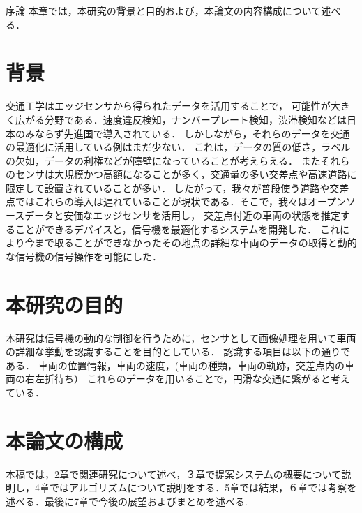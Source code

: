 \chapterhead
{序論}
{本章では，本研究の背景と目的および，本論文の内容構成について述べる．}

\section{背景}
交通工学はエッジセンサから得られたデータを活用することで，
可能性が大きく広がる分野である．速度違反検知，ナンバープレート検知，渋滞検知などは日本のみならず先進国で導入されている．
しかしながら，それらのデータを交通の最適化に活用している例はまだ少ない．
これは，データの質の低さ，ラベルの欠如，データの利権などが障壁になっていることが考えらえる．
またそれらのセンサは大規模かつ高額になることが多く，交通量の多い交差点や高速道路に限定して設置されていることが多い．
したがって，我々が普段使う道路や交差点ではこれらの導入は遅れていることが現状である．そこで，我々はオープンソースデータと安価なエッジセンサを活用し，
交差点付近の車両の状態を推定することができるデバイスと，信号機を最適化するシステムを開発した．
これにより今まで取ることができなかったその地点の詳細な車両のデータの取得と動的な信号機の信号操作を可能にした．


\section{本研究の目的}
本研究は信号機の動的な制御を行うために，センサとして画像処理を用いて車両の詳細な挙動を認識することを目的としている．
認識する項目は以下の通りである．
車両の位置情報，車両の速度，(車両の種類，車両の軌跡，交差点内の車両の右左折待ち）
これらのデータを用いることで，円滑な交通に繋がると考えている．

\section{本論文の構成}
本稿では，2章で関連研究について述べ，３章で提案システムの概要について説明し，4章ではアルゴリズムについて説明をする．5章では結果，６章では考察を述べる．最後に7章で今後の展望およびまとめを述べる.


\newpage
